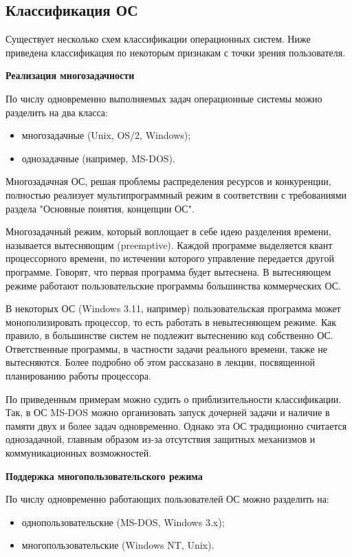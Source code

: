 \subsection{Классификация ОС}

Существует несколько схем классификации операционных систем. Ниже приведена классификация по некоторым признакам с точки зрения пользователя.

\textbf{Реализация многозадачности}

По числу одновременно выполняемых задач операционные системы можно разделить на два класса:
\begin{itemize}
   \item многозадачные (Unix, OS/2, Windows);
   \item однозадачные (например, MS-DOS).
\end{itemize}

Многозадачная ОС, решая проблемы распределения ресурсов и конкуренции, полностью реализует мультипрограммный режим в соответствии с требованиями раздела "Основные понятия, концепции ОС".

Многозадачный режим, который воплощает в себе идею разделения времени, называется вытесняющим (preemptive). Каждой программе выделяется квант процессорного времени, по истечении которого управление передается другой программе. Говорят, что первая программа будет вытеснена. В вытесняющем режиме работают пользовательские программы большинства коммерческих ОС.

В некоторых ОС (Windows 3.11, например) пользовательская программа может монополизировать процессор, то есть работать в невытесняющем режиме. Как правило, в большинстве систем не подлежит вытеснению код собственно ОС. Ответственные программы, в частности задачи реального времени, также не вытесняются. Более подробно об этом рассказано в лекции, посвященной планированию работы процессора.

По приведенным примерам можно судить о приблизительности классификации. Так, в ОС MS-DOS можно организовать запуск дочерней задачи и наличие в памяти двух и более задач одновременно. Однако эта ОС традиционно считается однозадачной, главным образом из-за отсутствия защитных механизмов и коммуникационных возможностей.

\textbf{Поддержка многопользовательского режима}

По числу одновременно работающих пользователей ОС можно разделить на:
\begin{itemize}
   \item однопользовательские (MS-DOS, Windows 3.x);
   \item многопользовательские (Windows NT, Unix).
\end{itemize}

